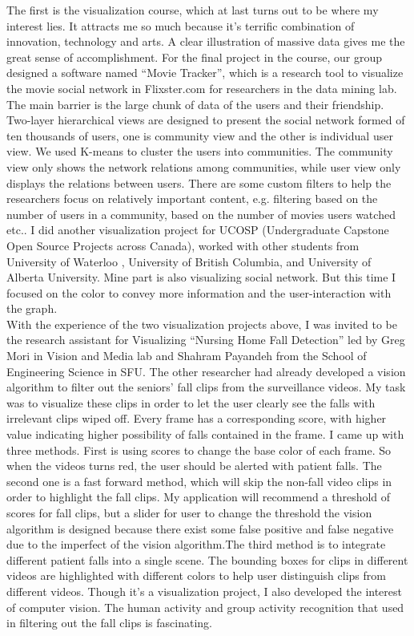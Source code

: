 \documentclass{article}
\begin{document}
The first is the visualization course, which at last turns out to be where my interest lies. It attracts me so much because it’s terrific combination of innovation, technology and arts. A clear illustration of massive data gives me the great sense of accomplishment. For the final project in the course, our group designed a software named “Movie Tracker”, which is a research tool to visualize the movie social network in Flixster.com for researchers in the data mining lab. The main barrier is the large chunk of data of the users and their friendship. Two-layer hierarchical views are designed to present the social network formed of ten thousands of users, one is community view and the other is individual user view. We used K-means to cluster the users into communities. The community view only shows the network relations among communities, while user view only displays the relations between users. There are some custom filters to help the researchers focus on relatively important content, e.g. filtering based on the number of users in a community, based on the number of movies users watched etc.. I did another visualization project for UCOSP (Undergraduate Capstone Open Source Projects across Canada), worked with other students from University of Waterloo , University of British Columbia, and University of Alberta University. Mine part is also visualizing social network. But this time I focused on the color to convey more information and the user-interaction with the graph. \\


With the experience of the two visualization projects above, I was invited to be the research assistant for Visualizing “Nursing Home Fall Detection” led by Greg Mori in Vision and Media lab and Shahram Payandeh from the School of Engineering Science in SFU. The other researcher had already developed a vision algorithm to filter out the seniors’ fall clips from the surveillance videos. My task was to visualize these clips in order to let the user clearly see the falls with irrelevant clips wiped off. Every frame has a corresponding score, with higher value indicating higher possibility of falls contained in the frame. I came up with three methods. First is using scores to change the base color of each frame. So when the videos turns red, the user should be alerted with patient falls. The second one is a fast forward method, which will skip the non-fall video clips in order to highlight the fall clips. My application will recommend a threshold of scores for fall clips, but a slider for user to change the threshold the vision algorithm is designed because there exist some false positive and false negative due to the imperfect of the vision algorithm.The third method is to integrate different patient falls into a single scene. The bounding boxes for clips in different videos are highlighted with different colors to help user distinguish clips from different videos. Though it’s a visualization project, I also developed the interest of computer vision. The human activity and group activity recognition that used in filtering out the fall clips is fascinating.  \\
\end{document}
